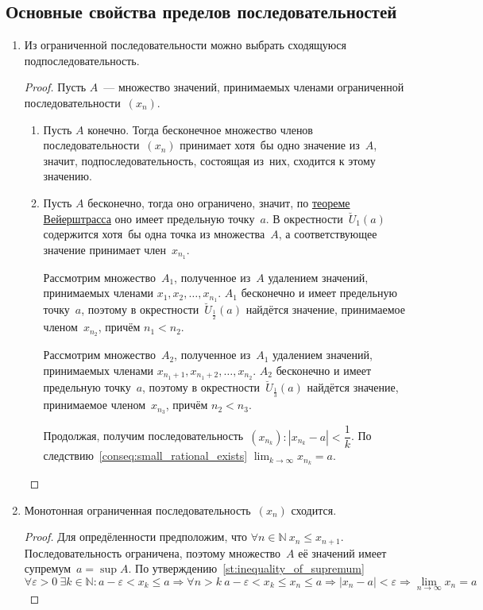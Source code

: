 \subsection{Основные свойства пределов последовательностей}
\begin{enumerate}
	\item Из ограниченной последовательности можно выбрать сходящуюся подпоследовательность.
	\begin{proof}
	Пусть $A$~--- множество значений, принимаемых членами ограниченной последовательности~$(x_n)$.
	\begin{enumerate}
		\item Пусть $A$ конечно.
		Тогда бесконечное множество членов последовательности~$(x_n)$ принимает хотя~бы одно значение из~$A$, значит, подпоследовательность, состоящая из~них, сходится к этому значению.
		
		\item Пусть $A$ бесконечно, тогда оно ограничено, значит, по \hyperref[th:Weierstrass]{теореме Вейерштрасса} оно имеет предельную точку~$a$.
		В окрестности~$\breve U_1(a)$ содержится хотя~бы одна точка из множества~$A$, а соответствующее значение принимает член~$x_{n_1}$.
		
		Рассмотрим множество~$A_1$, полученное из~$A$ удалением значений, принимаемых членами $x_1, x_2, \ldots, x_{n_1}$.
		$A_1$ бесконечно и имеет предельную точку~$a$, поэтому в окрестности~$\breve U_\frac12(a)$ найдётся значение, принимаемое членом~$x_{n_2}$, причём $n_1 < n_2$.
		
		Рассмотрим множество~$A_2$, полученное из~$A_1$ удалением значений, принимаемых членами $x_{n_1 + 1}, x_{n_1 + 2}, \ldots, x_{n_2}$.
		$A_2$ бесконечно и имеет предельную точку~$a$, поэтому в окрестности~$\breve U_\frac13(a)$ найдётся значение, принимаемое членом~$x_{n_3}$, причём $n_2 < n_3$.
		
		Продолжая, получим последовательность~$(x_{n_k}) \colon |x_{n_k} - a| < \dfrac1k$. По следствию~\ref{conseq:small_rational_exists} $\displaystyle \lim_{k \to \infty} x_{n_k} = a$.
	\end{enumerate}
	\end{proof}
	
	\item Монотонная ограниченная последовательность~$(x_n)$ сходится.
	\begin{proof}
	Для опредёленности предположим, что $\forall n \in \mathbb N \ x_n \leqslant x_{n+1}$.
	Последовательность ограничена, поэтому множество~$A$ её значений имеет супремум~$a = \sup A$.
	По утверждению~\ref{st:inequality_of_supremum}
	\begin{equation*}
	\forall \varepsilon > 0 \ \exists k \in \mathbb N \colon a - \varepsilon < x_k \leqslant a \Rightarrow
	\forall n > k \ a - \varepsilon < x_k \leqslant x_n \leqslant a \Rightarrow
	|x_n - a| < \varepsilon \Rightarrow \lim_{n \to \infty} x_n = a
	\end{equation*}
	\end{proof}
	

\end{enumerate}
